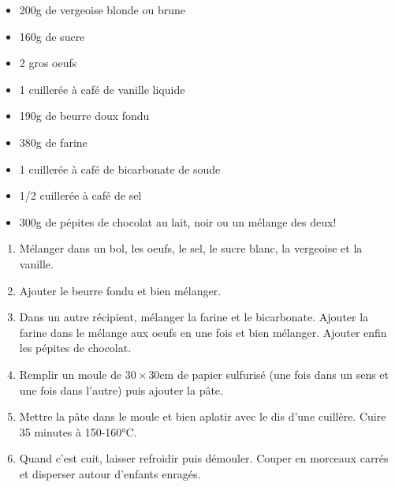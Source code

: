 \bigskip
{}
{}{
\begin{itemize}
	\item 200g de vergeoise blonde ou brune
	\item 160g de sucre
	\item 2 gros oeufs
	\item 1 cuillerée à café de vanille liquide
	\item 190g de beurre doux fondu
	\item 380g de farine
	\item 1 cuillerée à café de bicarbonate de soude
	\item 1/2 cuillerée à café de sel
	\item 300g de pépites de chocolat au lait, noir ou un mélange des deux!
\end{itemize}}
{\begin{enumerate}
	\item Mélanger dans un bol, les oeufs, le sel, le sucre blanc, la vergeoise et la vanille.
	\item Ajouter le beurre fondu et bien mélanger.
	\item Dans un autre récipient, mélanger la farine et le bicarbonate. Ajouter la farine dans le mélange aux oeufs en une fois et bien mélanger. Ajouter enfin les pépites de chocolat.
	\item Remplir un moule de $30\times30$cm de papier sulfurisé (une fois dans un sens et une fois dans l'autre) puis ajouter la pâte. 
	\item Mettre la pâte dans le moule et bien aplatir avec le dis d'une cuillère. Cuire 35 minutes à 150-160°C.
	\item Quand c'est cuit, laisser refroidir puis démouler. Couper en morceaux carrés et disperser autour d'enfants enragés.
\end{enumerate}}

